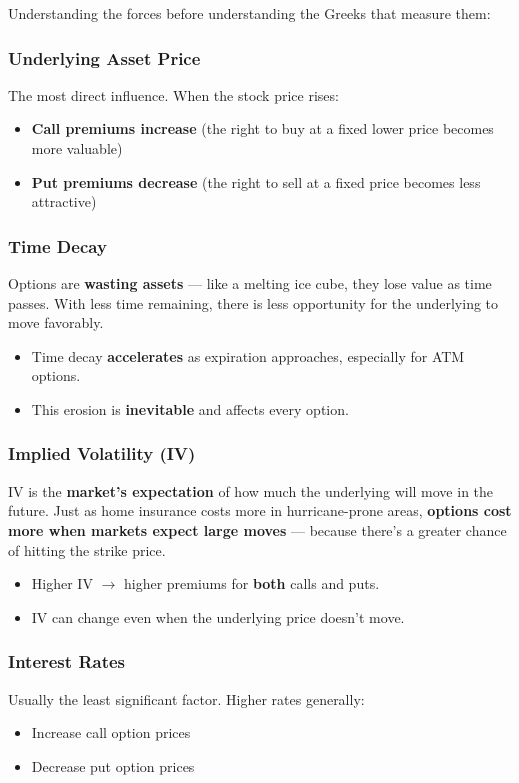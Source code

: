 \documentclass[12pt,openany]{book}
\begin{document}
Understanding the forces before understanding the Greeks that measure them:

\subsubsection{Underlying Asset Price}
The most direct influence. When the stock price rises:
\begin{itemize}[leftmargin=*]
    \item \textbf{Call premiums increase} (the right to buy at a fixed lower price becomes more valuable)
    \item \textbf{Put premiums decrease} (the right to sell at a fixed price becomes less attractive)
\end{itemize}

\subsubsection{Time Decay}
Options are \textbf{wasting assets} — like a melting ice cube, they lose value as time passes. With less time remaining, there is less opportunity for the underlying to move favorably.

\begin{itemize}[leftmargin=*]
    \item Time decay \textbf{accelerates} as expiration approaches, especially for ATM options.
    \item This erosion is \textbf{inevitable} and affects every option.
\end{itemize}

\subsubsection{Implied Volatility (IV)}
IV is the \textbf{market's expectation} of how much the underlying will move in the future. Just as home insurance costs more in hurricane-prone areas, \textbf{options cost more when markets expect large moves} — because there's a greater chance of hitting the strike price.

\begin{itemize}[leftmargin=*]
    \item Higher IV \(\rightarrow\) higher premiums for \textbf{both} calls and puts.
    \item IV can change even when the underlying price doesn't move.
\end{itemize}

\subsubsection{Interest Rates}
Usually the least significant factor. Higher rates generally:
\begin{itemize}[leftmargin=*]
    \item Increase call option prices
    \item Decrease put option prices
\end{itemize}
\end{document}
